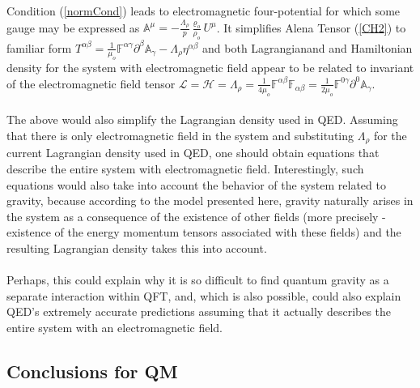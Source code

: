 \documentclass[aps,prx,preprint,groupedaddress,showkeys]{revtex4-2}
\begin{document}
Condition (\ref{normCond}) leads to electromagnetic four-potential for which some gauge may be expressed as $\mathbb{A}^{\mu} = - \frac{\Lambda_{\rho}}{p} \frac{\varrho_o}{\rho_o} U^{\mu}$. It simplifies Alena Tensor (\ref{CH2}) to familiar form $T^{\alpha \beta} = \frac{1}{\mu_o}\mathbb{F}^{\alpha \gamma} \partial^{\beta} \mathbb{A}_{\gamma} -  \Lambda_{\rho} \eta^{\alpha \beta}$ and both Lagrangianand and Hamiltonian density for the system with electromagnetic field appear to be related to invariant of the electromagnetic field tensor $\mathcal{L} = \mathcal{H} = \Lambda_{\rho} = \frac{1}{4\mu_o} \mathbb{F}^{\alpha \beta} \mathbb{F}_{\alpha \beta} = \frac{1}{2 \mu_o}\mathbb{F}^{0 \gamma} \partial^{0} \mathbb{A}_{\gamma}$.\\
~\\
The above would also simplify the Lagrangian density used in QED. Assuming that there is only electromagnetic field in the system and substituting $\Lambda_{\rho}$ for the current Lagrangian density used in QED, one should obtain equations that describe the entire system with electromagnetic field. Interestingly, such equations would also take into account the behavior of the system related to gravity, because according to the model presented here, gravity naturally arises in the system as a consequence of the existence of other fields (more precisely - existence of the energy momentum tensors associated with these fields) and the resulting Lagrangian density takes this into account.\\
~\\
Perhaps, this could explain why it is so difficult to find quantum gravity as a separate interaction within QFT, and, which is also possible, could also explain QED's extremely accurate predictions assuming that it actually describes the entire system with an electromagnetic field.

\subsection{Conclusions for QM}
\end{document}
